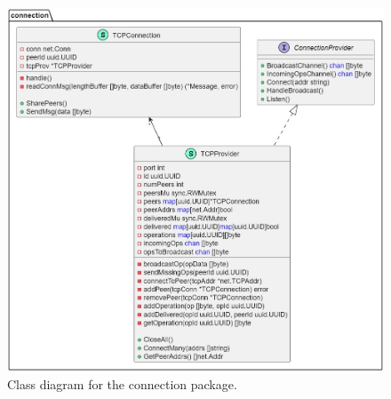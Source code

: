 \documentclass[12pt]{report}
\begin{document}
\begin{figure}[H] 
    \centering
    \includegraphics[width=1\textwidth]{images/network_impl.jpg}
    \caption{Class diagram for the connection package.}
    \label{fig:networkimpl}
\end{figure}
\end{document}
